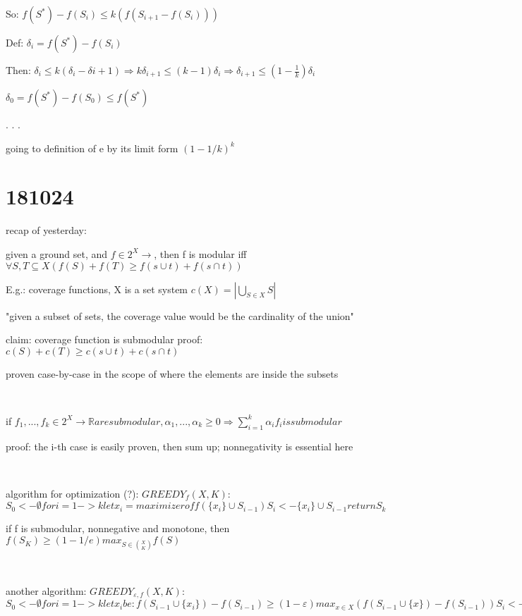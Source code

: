 \documentclass{report}
\begin{document}
	
	So: $f(S^*) - f(S_i) \leq k(f(S_{i+1} - f(S_i)))$
	
	Def: $\delta_i = f(S^*) - f(S_i)$
	
	Then: $\delta_i \leq k(\delta_i - \delta{i+1}) \Rightarrow k\delta_{i+1} \leq (k-1)\delta_i \Rightarrow \delta_{i+1} \leq (1-\frac{1}{k})\delta_i$
	
	$\delta_0 = f(S^*)-f(S_0) \leq f(S^*)$ %
	
	
	.
	.
	.
	
	going to definition of e by its limit form $(1-1/k)^k$
	
	
	\section{181024}
	
	recap of yesterday:
	
	given a ground set, and $f \in 2^X \to \mathbb{}$, then f is modular iff $\forall S, T \subseteq X (f(S)+f(T) \geq f(s\cup t) + f(s \cap t))$
	
	E.g.: coverage functions, X is a set system $c(X) = \left| \bigcup_{S \in X} S \right|$

	"given a subset of sets, the coverage value would be the cardinality of the union"
	
	claim: coverage function is submodular
	proof: $c(S)+c(T) \geq c(s\cup t) + c(s \cap t)$
	
	proven case-by-case in the scope of where the elements are inside the subsets
	
	\
	
	if $f_1, ..., f_k \in 2^X \to \mathbb{R} are submodular, \alpha_1, ..., \alpha_k \geq 0 \Rightarrow \sum_{i=1}^{k}\alpha_i f_i is submodular$
	
	proof: the i-th case is easily proven, then sum up; nonnegativity is essential here
	
	\
	
	algorithm for optimization (?): $GREEDY_f(X, K)$:
	$
	S_0 <- \emptyset
	for i=1 -> k
		let x_i = maximizer of f(\{x_i\} \cup S_{i-1})
		S_i <- \{x_i\} \cup S_{i-1}		
	return S_k
	$
	
	if f is submodular, nonnegative and monotone, then $\displaystyle f(S_K)\geq(1-1/e)max_{S \in \binom{X}{K}}f(S)$
	
	\
	
	another algorithm: $GREEDY_{\varepsilon, f}(X, K)$:
	$
	S_0 <- \emptyset
	for i=1 -> k
		let x_i be : f(S_{i-1} \cup \{x_i\}) - f(S_{i-1}) \geq (1-\varepsilon)max_{x \in X} (f(S_{i-1} \cup \{x\}) - f(S_{i-1})) %
		S_i <- \{x_i\} \cup S_{i-1}		
	return S_k
	$
	
\end{document}
